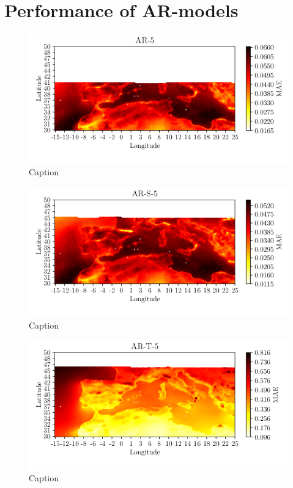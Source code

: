\section{Performance of AR-models}
\begin{figure}
    \centering
    \includegraphics{python_figs/mea_best_ar_model_tcc_AR_L1_in_folder_AR-5.png}
    \caption{Caption}
    \label{fig:my_label}
\end{figure}
\begin{figure}
    \centering
    \includegraphics{python_figs/mea_best_ar_model_tcc_AR_L1_in_folder_AR-S-5.png}
    \caption{Caption}
    \label{fig:my_label}
\end{figure}
\begin{figure}
    \centering
    \includegraphics{python_figs/mea_best_ar_model_tcc_AR_L1_in_folder_AR-T-5.png}
    \caption{Caption}
    \label{fig:my_label}
\end{figure}

